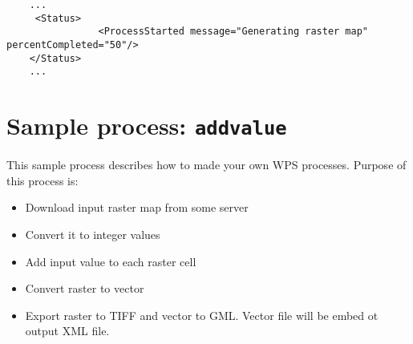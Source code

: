 \documentclass[a4paper,11pt]{article}
\begin{document}
    \begin{verbatim}
    ...
     <Status>
                <ProcessStarted message="Generating raster map" percentCompleted="50"/>
    </Status>
    ...
    \end{verbatim}

    \appendix
    \section{Sample process: \texttt{addvalue}}
    This sample process describes how to made your own WPS processes. Purpose of this process is:
    \begin{itemize}
    \item  Download input raster map from some server
    \item  Convert it to integer values
    \item  Add input value to each raster cell
    \item  Convert raster to vector
    \item  Export raster to TIFF and vector to GML. Vector file will be embed ot output XML file.
    \end{itemize}
\end{document}
